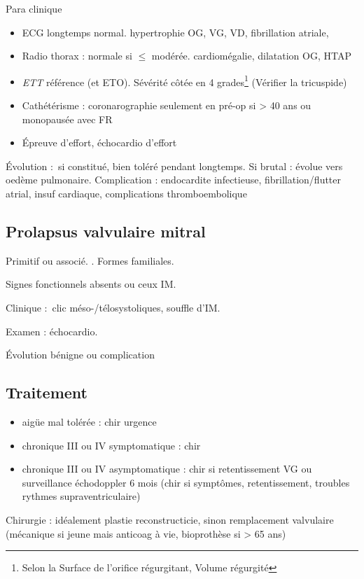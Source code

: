 Para clinique
\begin{itemize}
  \item ECG longtemps normal. hypertrophie OG, VG, VD, fibrillation atriale, 
  \item Radio thorax : normale si $\le$ modérée. cardiomégalie, dilatation OG,
    HTAP
  \item \textit{ETT} référence (et ETO). Sévérité côtée en 4 grades\footnote{Selon
      la Surface de l'orifice régurgitant, Volume régurgité} (Vérifier la
    tricuspide)
  \item Cathétérisme : coronarographie seulement en pré-op si \male > 40 ans ou
    \female{} monopausée avec FR
  \item Épreuve d'effort, échocardio d'effort
\end{itemize}

Évolution : si constitué, bien toléré pendant longtemps. Si brutal : évolue vers
oedème pulmonaire. Complication : endocardite infectieuse, fibrillation/flutter
atrial, insuf cardiaque, complications thromboembolique

\subsection{Prolapsus valvulaire mitral}
Primitif ou associé. \female. Formes familiales.

Signes fonctionnels absents ou ceux IM.

Clinique : clic méso-/télosystoliques, souffle d'IM.

Examen : échocardio.

Évolution bénigne ou complication

\subsection{Traitement}
\begin{itemize}
  \item aigüe mal tolérée : chir urgence 
  \item chronique III ou IV symptomatique : chir
  \item chronique III ou IV asymptomatique : chir si retentissement VG ou
    surveillance échodoppler 6 mois (chir si symptômes, retentissement, troubles
    rythmes supraventriculaire)
\end{itemize}

Chirurgie : idéalement plastie reconstructicie, sinon remplacement valvulaire
(mécanique si jeune mais anticoag à vie, bioprothèse si > 65 ans)

